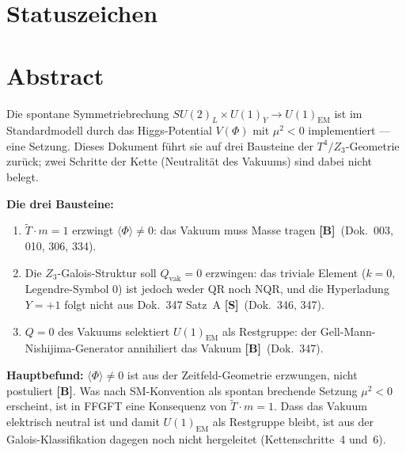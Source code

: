 \providecommand{\BM}{\textbf{[B]}}
\providecommand{\KM}{\textbf{[K]}}
\providecommand{\SM}{\textbf{[S]}}
\providecommand{\XM}{\textbf{[X]}}
\providecommand{\QM}{\textbf{[Q]}}

{}

\section*{Statuszeichen}


\section*{Abstract}

Die spontane Symmetriebrechung $SU(2)_L\times U(1)_Y\to U(1)_\text{EM}$
ist im Standardmodell durch das Higgs-Potential $V(\Phi)$ mit $\mu^2<0$
implementiert --- eine Setzung. Dieses Dokument führt sie auf drei
Bausteine der $T^4/Z_3$-Geometrie zurück; zwei Schritte der Kette
(Neutralität des Vakuums) sind dabei nicht belegt.

\textbf{Die drei Bausteine:}
\begin{enumerate}
\item $\tilde{T}\cdot m=1$ erzwingt $\langle\Phi\rangle\neq0$: das Vakuum
  muss Masse tragen \BM\ (Dok.~003, 010, 306, 334).
\item Die $Z_3$-Galois-Struktur soll $Q_\text{vak}=0$ erzwingen: das triviale
  Element ($k=0$, Legendre-Symbol $0$) ist jedoch weder QR noch NQR, und die
  Hyperladung $Y=+1$ folgt nicht aus Dok.~347 Satz~A \SM\ (Dok.~346, 347).
\item $Q=0$ des Vakuums selektiert $U(1)_\text{EM}$ als Restgruppe:
  der Gell-Mann-Nishijima-Generator annihiliert das Vakuum \BM\ (Dok.~347).
\end{enumerate}

\textbf{Hauptbefund:} $\langle\Phi\rangle\neq0$ ist aus der Zeitfeld-Geometrie
erzwungen, nicht postuliert \BM. Was nach SM-Konvention als spontan brechende
Setzung $\mu^2<0$ erscheint, ist in FFGFT eine Konsequenz von
$\tilde{T}\cdot m=1$. Dass das Vakuum elektrisch neutral ist und damit
$U(1)_\text{EM}$ als Restgruppe bleibt, ist aus der Galois-Klassifikation
dagegen noch nicht hergeleitet (Kettenschritte~4 und~6).

